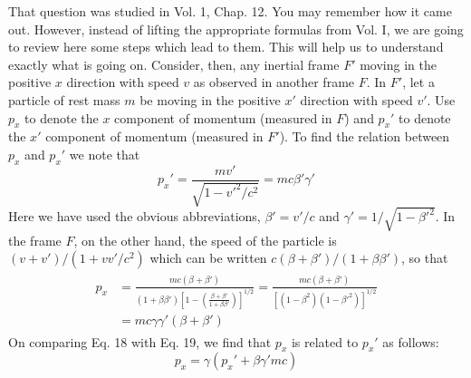 That question was studied in Vol. 1, Chap. 12. You may remember
how it came out. However, instead of lifting the appropriate formulas
from Vol. I, we are going to review here some steps which lead
to them. This will help us to understand exactly what is going on.
Consider, then, any inertial frame $F'$ moving in the positive $x$ direction
with speed $v$ as observed in another frame $F$. In $F'$, let a particle
of rest mass $m$ be moving in the positive $x'$ direction with speed $v'$.
Use $p_x$ to denote the $x$ component of momentum (measured in $F$)
and $p_x'$ to denote the $x'$ component of momentum (measured in $F'$).
To find the relation between $p_x$ and $p_x'$ we note that
\begin{equation}
  p_x' = \frac{mv'}{\sqrt{1-v'^2/c^2}} = mc\beta'\gamma'
\end{equation}
Here we have used the obvious abbreviations, $\beta' = v'/c$ and
$\gamma'=1/\sqrt{1-\beta'^2}$.
In the frame $F$, on the other hand, the speed of the particle is
$(v + v')/(1 + vv'/c^2)$ which can be written $c(\beta + \beta')/(1 + \beta\beta')$,
so that
\begin{align}
\begin{split}
  p_x &= \frac{mc(\beta+\beta')}{(1+\beta\beta')\left[1-\left(\frac{\beta+\beta'}{1+\beta\beta'}\right)\right]^{1/2}}
      = \frac{mc(\beta+\beta')}{\left[(1-\beta^2)(1-\beta'^2)\right]^{1/2}} \\
      &= mc\gamma\gamma'(\beta+\beta')
\end{split}
\end{align}
On comparing Eq. 18 with Eq. 19, we find that $p_x$ is related to $p_x'$ as
follows:
\begin{equation}
  p_x = \gamma(p_x'+\beta\gamma' mc)
\end{equation}

